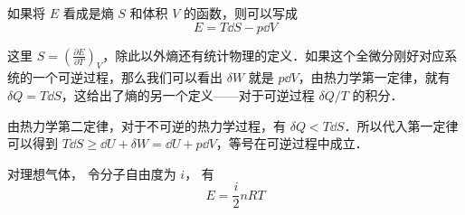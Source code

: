 如果将 $E$ 看成是熵 $S$  和体积 $V$ 的函数，则可以写成
\begin{equation}
E=T\dd S-p\dd V
\end{equation}

这里 $S=\left(\frac{\partial E}{\partial T}\right)_V$，除此以外熵还有统计物理的定义．如果这个全微分刚好对应系统的一个可逆过程，那么我们可以看出 $\delta W$ 就是 $p\dd V$，由热力学第一定律，就有 $\delta Q=T\dd S$，这给出了熵的另一个定义——对于可逆过程 $\delta Q/T$ 的积分．

由热力学第二定律，对于不可逆的热力学过程，有 $\delta Q<T\dd S$．所以代入第一定律可以得到 $T\dd S\ge \dd U+\delta W=\dd U+p\dd V$，等号在可逆过程中成立．

对理想气体， 令分子自由度为 $i$， 有
\begin{equation}
E = \frac{i}{2}n RT
\end{equation}

